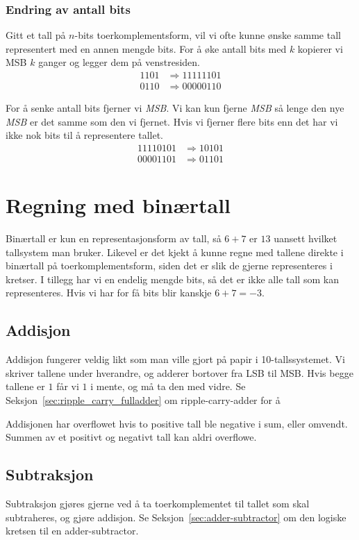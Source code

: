 \documentclass[12pt,a4paper,norsk]{article}
\begin{document}
\subsubsection{Endring av antall bits}
Gitt et tall på $n$-bits toerkomplementsform, vil vi ofte kunne ønske samme tall
representert med en annen mengde bits. For å øke antall bits med $k$ kopierer vi
MSB $k$ ganger og legger dem på venstresiden.
\begin{align*}
  1101 &\Rightarrow 11111101 \\
  0110 &\Rightarrow 00000110
\end{align*}

For å senke antall bits fjerner vi \textit{MSB}. Vi kan kun fjerne \textit{MSB}
så lenge den nye \textit{MSB} er det samme som den vi fjernet. Hvis vi fjerner
flere bits enn det har vi ikke nok bits til å representere tallet.
\begin{align*}
  11110101 &\Rightarrow 10101 \\
  00001101 &\Rightarrow 01101
\end{align*}

\section{Regning med binærtall}
Binærtall er kun en representasjonsform av tall, så $6+7$ er $13$ uansett
hvilket tallsystem man bruker. Likevel er det kjekt å kunne regne med tallene
direkte i binærtall på toerkomplementsform, siden det er slik de gjerne
representeres i kretser. I tillegg har vi en endelig mengde bits, så det er ikke
alle tall som kan representeres. Hvis vi har for få bits blir kanskje $6+7 = -3$.

\subsection{Addisjon}
Addisjon fungerer veldig likt som man ville gjort på papir i 10-tallssystemet.
Vi skriver tallene under hverandre, og adderer bortover fra LSB til MSB. Hvis
begge tallene er $1$ får vi $1$ i mente, og må ta den med vidre. Se
Seksjon~\ref{sec:ripple_carry_fulladder} om ripple-carry-adder for å 

Addisjonen har overflowet hvis to positive tall ble negative i sum, eller
omvendt. Summen av et positivt og negativt tall kan aldri overflowe.

\subsection{Subtraksjon}
Subtraksjon gjøres gjerne ved å ta toerkomplementet til tallet som skal
subtraheres, og gjøre addisjon. Se Seksjon~\ref{sec:adder-subtractor} om den
logiske kretsen til en adder-subtractor.
\end{document}

